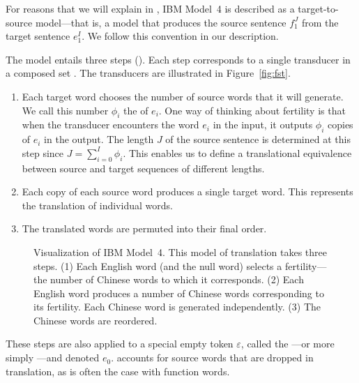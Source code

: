 For reasons that we will explain
in , IBM Model~4
is described as a target-to-source model---that is, a model that produces
the source sentence $f_1^J$ from the target
sentence $e_1^I$.  We follow this convention in our
description.

The model entails three steps ().
Each step corresponds to a single
transducer in a composed set \citep{Knight:1998:amta}.
The transducers are illustrated in Figure~\ref{fig:fst}.


\begin{enumerate}
\item Each target word chooses the number of
source words that it will generate.  
We call this number $\phi_i$ the 
of $e_i$.  One way of thinking about fertility
is that when the transducer encounters the
word $e_i$ in the input, it outputs $\phi_i$
copies of $e_i$ in the output.
The length $J$ of the source sentence is 
determined at this step since $J = \sum_{i=0}^I \phi_i$.
This enables us to define a translational equivalence
between source and target sequences of different lengths.

\item Each copy of each source word produces a single target word.  This represents the translation
of individual words.

\item The translated words are permuted into their final order.
\end{enumerate}

\figpreamble
\begin{figure*}[t]
\figfontsize{\begin{center}

\end{center}}
\figpostamble
\caption[Visualization of IBM Model 4.]{\label{fig:model4}Visualization of IBM Model~4. This
model of translation takes three steps. 
(1) Each English word (and the null word)
selects a fertility---the number of Chinese words
to which it corresponds.
(2) Each English word produces  a number of 
Chinese words corresponding to its fertility.  Each
Chinese word is generated independently.
(3) The Chinese words are reordered.}
\end{figure*}

These steps are also applied
to a special empty token
$\varepsilon$, called the ---or 
more simply ---and denoted $e_0$.  
accounts for source words that
are dropped in translation,
as is often the case with function words.

